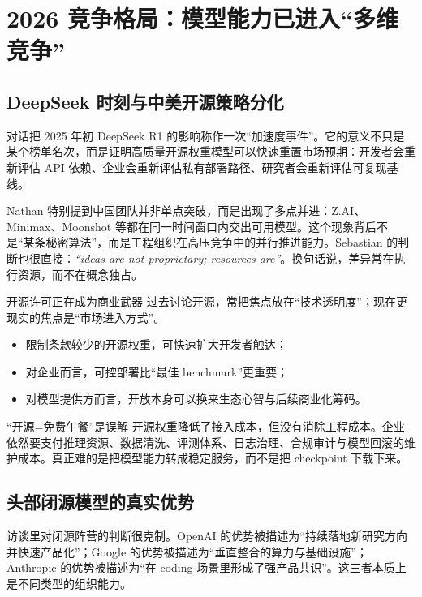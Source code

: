 \section{2026 竞争格局：模型能力已进入“多维竞争”}

\subsection{DeepSeek 时刻与中美开源策略分化}

对话把 2025 年初 DeepSeek R1 的影响称作一次“加速度事件”。它的意义不只是某个榜单名次，而是证明高质量开源权重模型可以快速重置市场预期：开发者会重新评估 API 依赖、企业会重新评估私有部署路径、研究者会重新评估可复现基线。

Nathan 特别提到中国团队并非单点突破，而是出现了多点并进：Z.AI、Minimax、Moonshot 等都在同一时间窗口内交出可用模型。这个现象背后不是“某条秘密算法”，而是工程组织在高压竞争中的并行推进能力。Sebastian 的判断也很直接：\textit{``ideas are not proprietary; resources are''}。换句话说，差异常在执行资源，而不在概念独占。

\begin{importantbox}{开源许可正在成为商业武器}
过去讨论开源，常把焦点放在“技术透明度”；现在更现实的焦点是“市场进入方式”。
\begin{itemize}[leftmargin=1.5em]
    \item 限制条款较少的开源权重，可快速扩大开发者触达；
    \item 对企业而言，可控部署比“最佳 benchmark”更重要；
    \item 对模型提供方而言，开放本身可以换来生态心智与后续商业化筹码。
\end{itemize}
\end{importantbox}

\begin{warningbox}{“开源=免费午餐”是误解}
开源权重降低了接入成本，但没有消除工程成本。企业依然要支付推理资源、数据清洗、评测体系、日志治理、合规审计与模型回滚的维护成本。真正难的是把模型能力转成稳定服务，而不是把 checkpoint 下载下来。
\end{warningbox}

\subsection{头部闭源模型的真实优势}

访谈里对闭源阵营的判断很克制。OpenAI 的优势被描述为“持续落地新研究方向并快速产品化”；Google 的优势被描述为“垂直整合的算力与基础设施”；Anthropic 的优势被描述为“在 coding 场景里形成了强产品共识”。这三者本质上是不同类型的组织能力。


